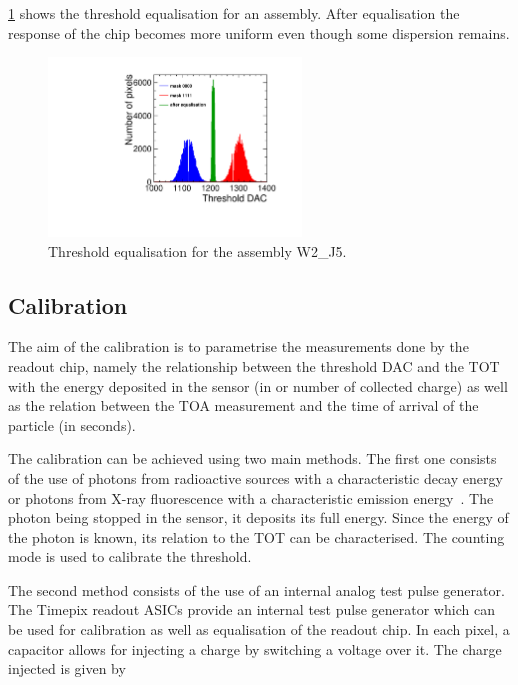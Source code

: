 \cref{fig:THLequalisation} shows the threshold equalisation for an
assembly. After equalisation the response of the chip becomes more
uniform even though some dispersion remains.

\begin{figure}[htbp] 
  \centering
  \includegraphics[width=0.6\textwidth]{./figures/Calibration/THLequalisation_W2_J5.pdf}
  \caption{Threshold equalisation for the assembly W2\_J5.}
  \label{fig:THLequalisation}
\end{figure}

\subsection{Calibration} \label{sec:calibration} The aim of the
calibration is to parametrise the measurements done by the readout
chip, namely the relationship between the threshold DAC and the TOT
with the energy deposited in the sensor (in \kev or number of
collected charge) as well as the relation between the TOA measurement
and the time of arrival of the particle (in seconds).

The calibration can be achieved using two main methods. The first one
consists of the use of photons from radioactive sources with a
characteristic decay energy or photons from X-ray fluorescence with a
characteristic emission energy~\cite{AlipourTehrani:2054922}. The
photon being stopped in the sensor, it deposits its full energy. Since
the energy of the photon is known, its relation to the TOT can be
characterised. The counting mode is used to calibrate the threshold.

The second method consists of the use of an internal analog test pulse
generator. The Timepix readout ASICs provide an internal test pulse
generator which can be used for calibration as well as equalisation of
the readout chip. In each pixel, a capacitor allows for injecting a
charge by switching a voltage over it. The charge injected is given by

